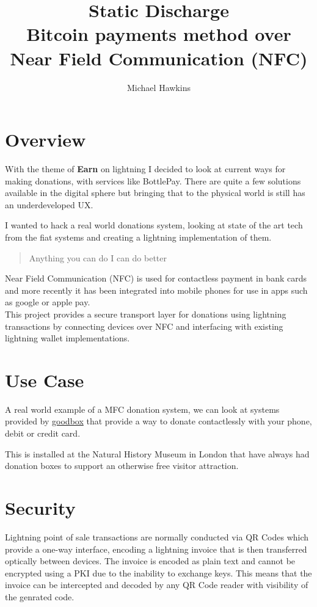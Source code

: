 \documentclass[a4paper]{article}
\begin{document}
\author{Michael Hawkins}
\title{%
	Static Discharge\\
	\large Bitcoin payments method over\\
	Near Field Communication (NFC)}

\maketitle

\section{Overview}
With the theme of \textbf{Earn} on lightning I decided to look at current ways
for making donations, with services like BottlePay.  There are quite a few
solutions available in the digital sphere but bringing that to the physical
world is still has an underdeveloped UX.

I wanted to hack a real world donations system, looking at state of the art
tech from the fiat systems and creating a lightning implementation of them.

\begin{quote}
Anything you can do I can do better
\end{quote}

Near Field Communication (NFC) is used for contactless payment in bank cards and
more recently it has been integrated into mobile phones for use in apps such as
google or apple pay.\\

This project provides a secure transport layer for donations using lightning
transactions by connecting devices over NFC and interfacing with existing
lightning wallet implementations.

\section{Use Case}
A real world example of a MFC donation system, we can look at systems provided
by \href{https://www.goodbox.com/2018/10/natural-history-museum/}{goodbox} that
provide a way to donate contactlessly with your phone, debit or credit card.

This is installed at the Natural History Museum in London that have always had
donation boxes to support an otherwise free visitor attraction.

\section{Security}
Lightning point of sale transactions are normally conducted via QR Codes which
provide a one-way interface, encoding a lightning invoice that is then
transferred optically between devices.  The invoice is encoded as plain text
and cannot be encrypted using a PKI due to the inability to exchange keys.  This
means that the invoice can be intercepted and decoded by any QR Code reader with
visibility of the genrated code.\\
\end{document}
